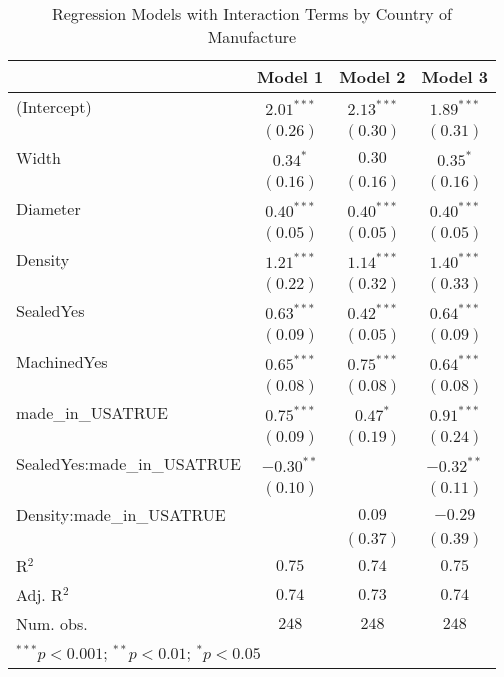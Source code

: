 
\begin{table}
\begin{center}
\begin{tabular}{l c c c}
\hline
 & Model 1 & Model 2 & Model 3 \\
\hline
(Intercept)                 & $2.01^{***}$ & $2.13^{***}$ & $1.89^{***}$ \\
                            & $(0.26)$     & $(0.30)$     & $(0.31)$     \\
Width                       & $0.34^{*}$   & $0.30$       & $0.35^{*}$   \\
                            & $(0.16)$     & $(0.16)$     & $(0.16)$     \\
Diameter                    & $0.40^{***}$ & $0.40^{***}$ & $0.40^{***}$ \\
                            & $(0.05)$     & $(0.05)$     & $(0.05)$     \\
Density                     & $1.21^{***}$ & $1.14^{***}$ & $1.40^{***}$ \\
                            & $(0.22)$     & $(0.32)$     & $(0.33)$     \\
SealedYes                   & $0.63^{***}$ & $0.42^{***}$ & $0.64^{***}$ \\
                            & $(0.09)$     & $(0.05)$     & $(0.09)$     \\
MachinedYes                 & $0.65^{***}$ & $0.75^{***}$ & $0.64^{***}$ \\
                            & $(0.08)$     & $(0.08)$     & $(0.08)$     \\
made\_in\_USATRUE           & $0.75^{***}$ & $0.47^{*}$   & $0.91^{***}$ \\
                            & $(0.09)$     & $(0.19)$     & $(0.24)$     \\
SealedYes:made\_in\_USATRUE & $-0.30^{**}$ &              & $-0.32^{**}$ \\
                            & $(0.10)$     &              & $(0.11)$     \\
Density:made\_in\_USATRUE   &              & $0.09$       & $-0.29$      \\
                            &              & $(0.37)$     & $(0.39)$     \\
\hline
R$^2$                       & $0.75$       & $0.74$       & $0.75$       \\
Adj. R$^2$                  & $0.74$       & $0.73$       & $0.74$       \\
Num. obs.                   & $248$        & $248$        & $248$        \\
\hline
\multicolumn{4}{l}{\scriptsize{$^{***}p<0.001$; $^{**}p<0.01$; $^{*}p<0.05$}}
\end{tabular}
\caption{Regression Models with Interaction Terms by Country of Manufacture}
\label{tab:reg_interactions}
\end{center}
\end{table}
